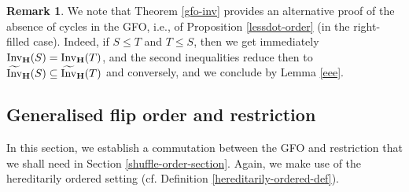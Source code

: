 \documentclass{article}
\theoremstyle{plain}
\theoremstyle{definition}
\newtheorem{remark}[thm]{Remark}
\newcommand{\inc}{\subseteq}
\newcommand{\Invt}{\widetilde{\mathrm{Inv}}}
\newcommand{\Inv}{{\mathrm{Inv}}}
\begin{document}
\begin{remark} We note that Theorem \ref{gfo-inv} provides an alternative proof of the absence of cycles in the GFO, i.e., of Proposition \ref{lessdot-order} (in the right-filled case). Indeed, if $S\leq T$ and $T\leq S$, then we get immediately $\Inv_{\bf H}(S)= \Inv_{\bf H}(T)$, and the second inequalities reduce then to $\Invt_{\bf H}(S)\inc \Invt_{\bf H}(T)$ and conversely, and we conclude by Lemma \ref{eee}.
\end{remark}

\subsection{Generalised flip order and restriction}

In this section, we establish a commutation between the GFO and restriction that we shall need in Section \ref{shuffle-order-section}. Again, we make use of the hereditarily ordered setting (cf. Definition \ref{hereditarily-ordered-def}).
\end{document}
